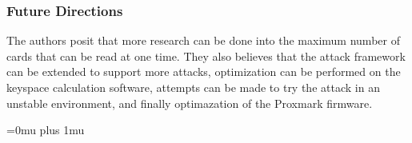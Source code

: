 \subsubsection{Future Directions}

\noindent
The authors posit that more research can be done into the maximum number of cards that can be read at one time.  They also believes that the attack framework can be extended to support more attacks, optimization can be performed on the keyspace calculation software, attempts can be made to try the attack in an unstable environment, and finally optimazation of the Proxmark firmware.

\Urlmuskip=0mu plus 1mu\relax
\pagebreak
